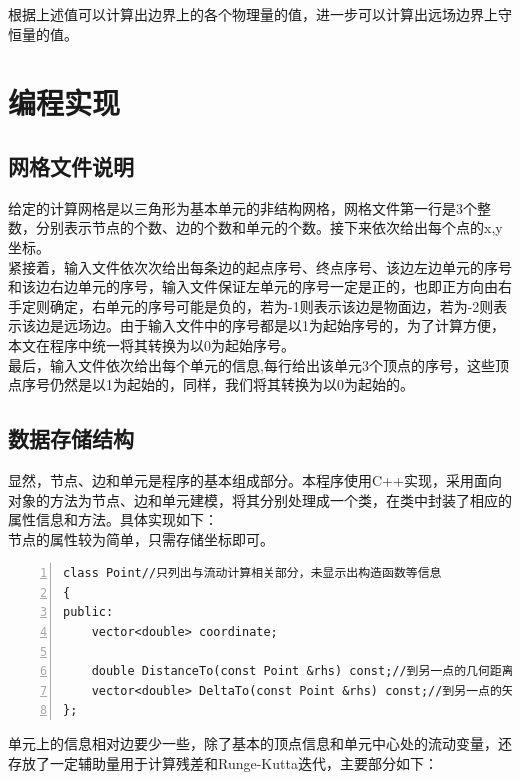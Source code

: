 \documentclass[UTF8]{ctexart}
\begin{document}
\indent 根据上述值可以计算出边界上的各个物理量的值，进一步可以计算出远场边界上守恒量的值。

\section{编程实现}
\subsection{网格文件说明}
给定的计算网格是以三角形为基本单元的非结构网格，网格文件第一行是3个整数，分别表示节点的个数、边的个数和单元的个数。接下来依次给出每个点的x,y坐标。\\
\indent 紧接着，输入文件依次次给出每条边的起点序号、终点序号、该边左边单元的序号和该边右边单元的序号，输入文件保证左单元的序号一定是正的，也即正方向由右手定则确定，右单元的序号可能是负的，若为-1则表示该边是物面边，若为-2则表示该边是远场边。由于输入文件中的序号都是以1为起始序号的，为了计算方便，本文在程序中统一将其转换为以0为起始序号。\\
\indent 最后，输入文件依次给出每个单元的信息,每行给出该单元3个顶点的序号，这些顶点序号仍然是以1为起始的，同样，我们将其转换为以0为起始的。

\subsection{数据存储结构}
显然，节点、边和单元是程序的基本组成部分。本程序使用C++实现，采用面向对象的方法为节点、边和单元建模，将其分别处理成一个类，在类中封装了相应的属性信息和方法。具体实现如下：\\
\indent 节点的属性较为简单，只需存储坐标即可。
\begin{lstlisting}[numbers=left, numberstyle=\tiny, keywordstyle=\color{blue!70}, commentstyle=\color{red!50!green!50!blue!50}, frame=shadowbox, rulesepcolor=\color{red!20!green!20!blue!20}]
class Point//只列出与流动计算相关部分，未显示出构造函数等信息
{
public:
	vector<double> coordinate;

	double DistanceTo(const Point &rhs) const;//到另一点的几何距离
	vector<double> DeltaTo(const Point &rhs) const;//到另一点的矢量
};
\end{lstlisting}

\indent 单元上的信息相对边要少一些，除了基本的顶点信息和单元中心处的流动变量，还存放了一定辅助量用于计算残差和Runge-Kutta迭代，主要部分如下：
\end{document}
